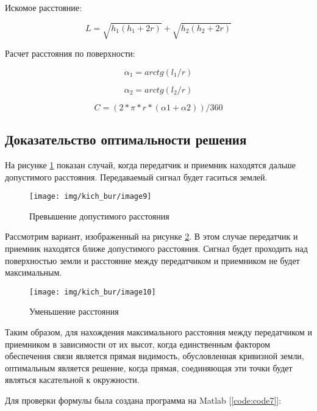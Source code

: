 Искомое расстояние: 

\[
L=\sqrt{h_{1}\left(h_{1}+2r\right)}+\sqrt{h_{2}\left(h_{2}+2r\right)}
\]

Расчет расстояния по поверхности: 

\[
\alpha_{1}=arctg(l_{1}/r)
\]

\[
\alpha_{2}=arctg(l_{2}/r)
\]

\[
C=(2*\pi*r*(\alpha1+\alpha2))/360
\]

\subsection{Доказательство оптимальности решения}
На рисунке \ref{fig:img9} показан случай, когда передатчик и приемник находятся дальше допустимого расстояния. Передаваемый сигнал будет гаситься землей.

\begin{figure}[H]
\centering{}\texttt{[image: img/kich\_bur/image9]}
\caption{Превышение допустимого расстояния}
\label{fig:img9}
\end{figure}

Рассмотрим вариант, изображенный на рисунке \ref{fig:img10}. В этом случае передатчик и приемник находятся ближе допустимого расстояния. Сигнал будет проходить над поверхностью земли и расстояние между передатчиком и приемником не будет максимальным. 

\begin{figure}[H]
\centering{}\texttt{[image: img/kich\_bur/image10]}
\caption{Уменьшение расстояния}
\label{fig:img10}
\end{figure}

Таким образом, для нахождения максимального расстояния между передатчиком и приемником в зависимости от их высот, когда единственным фактором обеспечения связи является прямая видимость, обусловленная кривизной
земли, оптимальным является решение, когда прямая, соединяющая эти точки будет являться касательной к окружности.

Для проверки формулы была создана программа на Matlab [\ref{code:code7}]:


